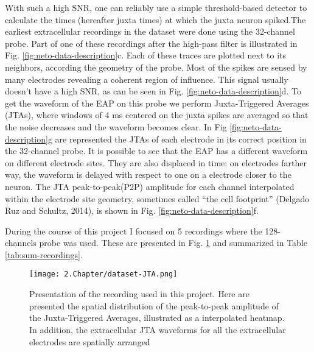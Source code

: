With such a high SNR, one can reliably use a simple threshold-based detector to calculate the times (hereafter juxta times) at which the juxta neuron spiked.The earliest extracellular recordings in the dataset were done using the 32-channel probe. Part of one of these recordings after the high-pass filter is illustrated in Fig. \ref{fig:neto-data-description}c.  Each of these traces are plotted next to its neighbors, according the geometry of the probe. Most of the spikes are sensed by many electrodes revealing a coherent region of influence. This signal usually doesn't have a high SNR, as can be seen in Fig. \ref{fig:neto-data-description}d. To get the waveform of the EAP on this probe we perform Juxta-Triggered Averages (JTAs), where windows of 4 ms centered on the juxta spikes are averaged so that the noise decreases and the waveform becomes clear. In Fig \ref{fig:neto-data-description}g are represented the JTAs of each electrode in its correct position in the 32-channel probe. It is possible to see that the EAP has a different waveform on different electrode sites. They are also displaced in time: on electrodes farther way, the waveform is delayed with respect to one on a electrode closer to the neuron. The JTA peak-to-peak(P2P) amplitude for each channel interpolated within the electrode site geometry, sometimes called “the cell footprint” (Delgado Ruz and Schultz, 2014), is shown in Fig. \ref{fig:neto-data-description}f.

During the course of this project I focused on 5 recordings where the 128-channels probe was used. These are presented in Fig. \ref{fig:recordings-summary} and summarized in Table \ref{tab:sum-recordings}.

\begin{figure}[!h]
	\centering
	\texttt{[image: 2.Chapter/dataset-JTA.png]}
	\caption{Presentation of the recording used in this project. Here are presented the spatial distribution of the peak-to-peak amplitude of the Juxta-Triggered Averages, illustrated as a interpolated heatmap. In addition, the extracellular JTA waveforms for all the extracellular electrodes are spatially arranged
}
\label{fig:recordings-summary}
\end{figure}


